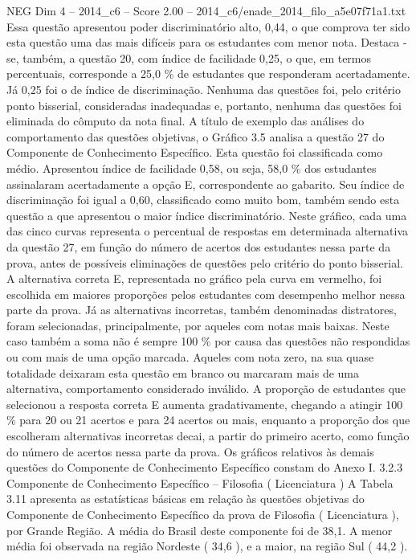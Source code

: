 \begin{textsample}{NEG Dim 4 – 2014\_c6 – Score 2.00 – 2014\_c6/enade\_2014\_filo\_a5e07f71a1.txt}
Essa questão apresentou poder discriminatório alto, 0,44, o que comprova ter sido esta questão uma das mais difíceis para os estudantes com menor nota.
Destaca -se, também, a questão 20, com índice de facilidade 0,25, o que, em termos percentuais, corresponde a 25,0 \% de estudantes que responderam acertadamente.
Já 0,25 foi o de índice de discriminação.
Nenhuma das questões foi, pelo critério ponto bisserial, consideradas inadequadas e, portanto, nenhuma das questões foi eliminada do cômputo da nota final.
A título de exemplo das análises do comportamento das questões objetivas, o Gráfico 3.5 analisa a questão 27 do Componente de Conhecimento Específico.
Esta questão foi classificada como médio.
Apresentou índice de facilidade 0,58, ou seja, 58,0 \% dos estudantes assinalaram acertadamente a opção E, correspondente ao gabarito.
Seu índice de discriminação foi igual a 0,60, classificado como muito bom, também sendo esta questão a que apresentou o maior índice discriminatório.
Neste gráfico, cada uma das cinco curvas representa o percentual de respostas em determinada alternativa da questão 27, em função do número de acertos dos estudantes nessa parte da prova, antes de possíveis eliminações de questões pelo critério do ponto bisserial.
A alternativa correta E, representada no gráfico pela curva em vermelho, foi escolhida em maiores proporções pelos estudantes com desempenho melhor nessa parte da prova.
Já as alternativas incorretas, também denominadas distratores, foram selecionadas, principalmente, por aqueles com notas mais baixas.
Neste caso também a soma não é sempre 100 \% por causa das questões não respondidas ou com mais de uma opção marcada.
Aqueles com nota zero, na sua quase totalidade deixaram esta questão em branco ou marcaram mais de uma alternativa, comportamento considerado inválido.
A proporção de estudantes que selecionou a resposta correta E aumenta gradativamente, chegando a atingir 100 \% para 20 ou 21 acertos e para 24 acertos ou mais, enquanto a proporção dos que escolheram alternativas incorretas decai, a partir do primeiro acerto, como função do número de acertos nessa parte da prova.
Os gráficos relativos às demais questões do Componente de Conhecimento Específico constam do Anexo I. 3.2.3 Componente de Conhecimento Específico – Filosofia ( Licenciatura ) A Tabela 3.11 apresenta as estatísticas básicas em relação às questões objetivas do Componente de Conhecimento Específico da prova de Filosofia ( Licenciatura ), por Grande Região.
A média do Brasil deste componente foi de 38,1.
A menor média foi observada na região Nordeste ( 34,6 ), e a maior, na região Sul ( 44,2 ).

\end{textsample}
